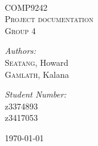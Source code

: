\begin{titlepage}
\begin{center}

\hfill \\[5cm]
\textsc{\LARGE COMP9242}\\[1.5cm]

\textsc{\Large Project documentation}\\[1.5cm]

\textsc{Group 4}\\[1.5cm]

\begin{minipage}{0.4\textwidth}
\begin{flushleft} \large
\emph{Authors:}\\
\textsc{Seatang}, Howard \\
\textsc{Gamlath}, Kalana

\end{flushleft}
\end{minipage}
\begin{minipage}{0.4\textwidth}
\begin{flushright} \large
\emph{Student Number:} \\
z3374893 \\
z3417053
\end{flushright}
\end{minipage}

\vfill

{\large \today}

\end{center}

\cleardoublepage

\end{titlepage}
